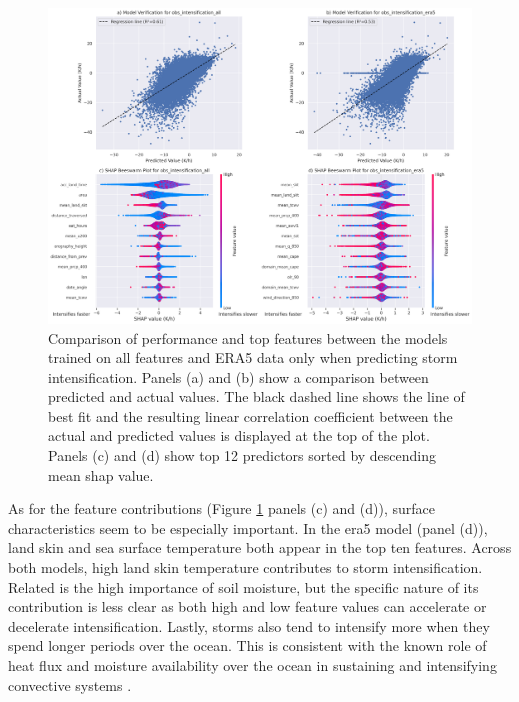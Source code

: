 \begin{figure}[ht]
    \centering
    \includegraphics[width=\textwidth]{../figures/generated/experiments/obs_intensification/obs_intensification_summary.png}
    \caption{Comparison of performance and top features between the models trained on all features and ERA5 data only when predicting storm intensification. Panels (a) and (b) show a comparison between predicted and actual values. The black dashed line shows the line of best fit and the resulting linear correlation coefficient between the actual and predicted values is displayed at the top of the plot. Panels (c) and (d) show top 12 predictors sorted by descending mean \acrshort{shap} value.}
    \label{fig:obs_intensification_summary}
\end{figure}

As for the feature contributions (Figure \ref{fig:obs_intensification_summary} panels (c) and (d)), surface characteristics seem to be especially important. In the \acrshort{era5} model (panel (d)), land skin and sea surface temperature both appear in the top ten features. Across both models, high land skin temperature contributes to storm intensification. Related is the high importance of soil moisture, but the specific nature of its contribution is less clear as both high and low feature values can accelerate or decelerate intensification. Lastly, storms also tend to intensify more when they spend longer periods over the ocean. This is consistent with the known role of heat flux and moisture availability over the ocean in sustaining and intensifying convective systems \citep{Klein2021,Sud1998,Abbott2025}.

